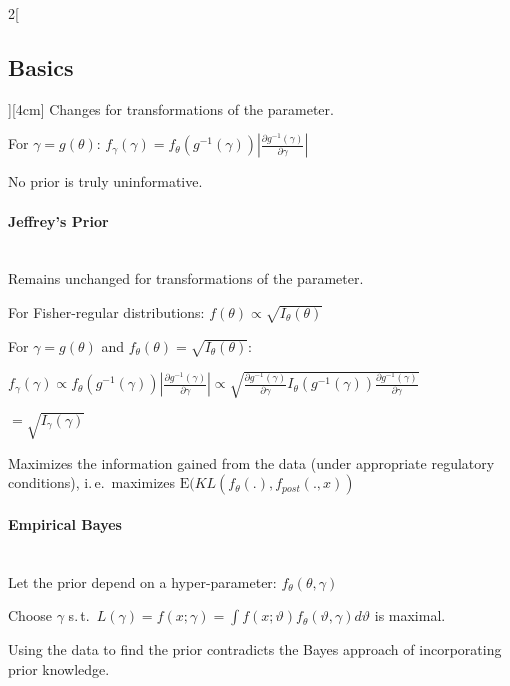 \documentclass[8pt]{extarticle}
\begin{document}
\begin{multicols}{2}[\subsection{Basics}][4cm]
\noindent Changes for transformations of the parameter.

\begin{Proof}

\vspace{-2.3em}
\centering
For $\gamma = g(\theta)$: $f_\gamma(\gamma)=f_\theta(g^{-1}(\gamma))\left|\frac{\partial g^{-1}(\gamma)}{\partial \gamma}\right|$
\end{Proof}

 \noindent No prior is truly uninformative.


\paragraph{Jeffrey's Prior} \ \\

\noindent Remains unchanged for transformations of the parameter.

\noindent For Fisher-regular distributions: $f(\theta) \propto \sqrt{I_\theta(\theta)}$

\begin{Proof}
For $\gamma = g(\theta)$ and $f_\theta(\theta) = \sqrt{I_\theta(\theta)}$:

\noindent $f_\gamma(\gamma)  \propto f_\theta(g^{-1}(\gamma))\left|\frac{\partial g^{-1}(\gamma)}{\partial \gamma}\right| \propto \sqrt{\frac{\partial g^{-1}(\gamma)}{\partial \gamma}  I_\theta(g^{-1}(\gamma)) \frac{\partial g^{-1}(\gamma)}{\partial \gamma}}$ 

\raggedleft
$ = \sqrt{I_\gamma(\gamma)}$
\end{Proof}

\noindent\begin{minipage}{\dimexpr\linewidth}
\raggedright
Maximizes the information gained from the data (under appropriate regulatory conditions), i.\,e.\ maximizes $\mathrm{E}(KL(f_\theta(.), f_{post}(.,x))$
\end{minipage}

\paragraph{Empirical Bayes} \ \\

\noindent Let the prior depend on a hyper-parameter: $f_\theta(\theta,\gamma)$

\noindent Choose $\gamma$ s.\,t.\ $L(\gamma) = f(x;\gamma) = \int f(x;\vartheta) f_\theta(\vartheta, \gamma)d\vartheta$ is maximal.

\noindent Using the data to find the prior contradicts the Bayes approach of incorporating prior knowledge.


\end{multicols}
\end{document}

